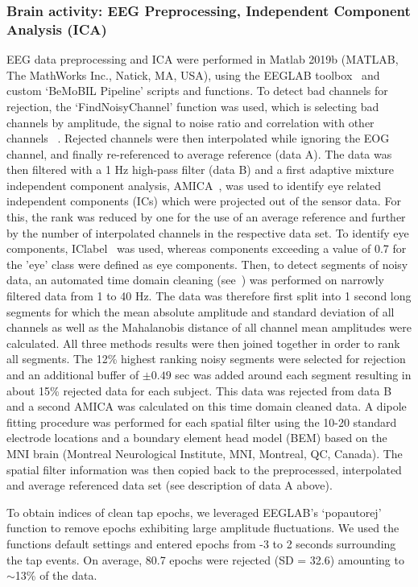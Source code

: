 \subsubsection{Brain activity: EEG Preprocessing, Independent Component Analysis (ICA)}
EEG data preprocessing and ICA were performed in Matlab 2019b (MATLAB, The MathWorks Inc., Natick, MA, USA), using the EEGLAB toolbox~\cite{Delorme2004-sn} and custom `BeMoBIL Pipeline' scripts and functions. To detect bad channels for rejection, the `FindNoisyChannel' function was used, which is selecting bad channels by amplitude, the signal to noise ratio and correlation with other channels ~\cite{Bigdely-Shamlo2015-ds}. Rejected channels were then interpolated while ignoring the EOG channel, and finally re-referenced to average reference (data A). The data was then filtered with a 1 Hz high-pass filter (data B) and a first adaptive mixture independent component analysis, AMICA~\cite{Palmer2011-zs}, was used to identify eye related independent components (ICs) which were projected out of the sensor data. For this, the rank was reduced by one for the use of an average reference and further by the number of interpolated channels in the respective data set. To identify eye components, IClabel~\cite{Pion-Tonachini2019-fy} was used, whereas components exceeding a value of 0.7 for the 'eye' class were defined as eye components. Then, to detect segments of noisy data, an automated time domain cleaning (see~\cite{gramann2021human}) was performed on narrowly filtered data from 1 to 40 Hz. The data was therefore first split into 1 second long segments for which the mean absolute amplitude and standard deviation of all channels as well as the Mahalanobis distance of all channel mean amplitudes were calculated. All three methods results were then joined together in order to rank all segments. The 12\% highest ranking noisy segments were selected for rejection and an additional buffer of $\pm 0.49$ sec was added around each segment resulting in about 15\% rejected data for each subject. This data was rejected from data B and a second AMICA was calculated on this time domain cleaned data. A dipole fitting procedure was performed for each spatial filter using the 10-20 standard electrode locations and a boundary element head model (BEM) based on the MNI brain (Montreal Neurological Institute, MNI, Montreal, QC, Canada). The spatial filter information was then copied back to the preprocessed, interpolated and average referenced data set (see description of data A above).

To obtain indices of clean tap epochs, we leveraged EEGLAB's `pop\textunderscore autorej' function to remove epochs exhibiting large amplitude fluctuations. We used the functions default settings and entered epochs from -3 to 2 seconds surrounding the tap events. On average, 80.7 epochs were rejected (SD = 32.6) amounting to $\sim$13\% of the data.

